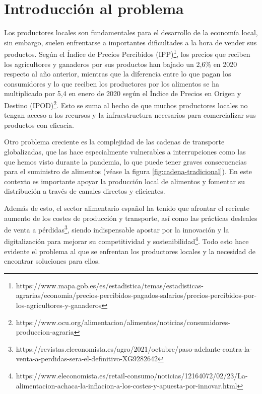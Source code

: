 
\section{Introducción al problema}\label{sec:intro}

Los productores locales son fundamentales para el desarrollo de la economía local, sin embargo, suelen enfrentarse a importantes dificultades a la hora de vender sus productos. Según el Índice de Precios Percibidos (IPP)\footnote{https://www.mapa.gob.es/es/estadistica/temas/estadisticas-agrarias/economia/precios-percibidos-pagados-salarios/precios-percibidos-por-los-agricultores-y-ganaderos}, los precios que reciben los agricultores y ganaderos por sus productos han bajado un 2,6\% en 2020 respecto al año anterior, mientras que la diferencia entre lo que pagan los consumidores y lo que reciben los productores por los alimentos se ha multiplicado por 5,4 en enero de 2020 según el Índice de Precios en Origen y Destino (IPOD)\footnote{https://www.ocu.org/alimentacion/alimentos/noticias/consumidores-produccion-agraria}. Esto se suma al hecho de que muchos productores locales no tengan acceso a los recursos y la infraestructura necesarios para comercializar sus productos con eficacia.

Otro problema creciente es la complejidad de las cadenas de transporte globalizadas, que las hace especialmente vulnerables a interrupciones como las que hemos visto durante la pandemia, lo que puede tener graves consecuencias para el suministro de alimentos (véase la figura \ref{fig:cadena-tradicional}). En este contexto es importante apoyar la producción local de alimentos y fomentar su distribución a través de canales directos y eficientes.

Además de esto, el sector alimentario español ha tenido que afrontar el reciente aumento de los costes de producción y transporte, así como las prácticas desleales de venta a pérdidas\footnote{https://revistas.eleconomista.es/agro/2021/octubre/paso-adelante-contra-la-venta-a-perdidas-sera-el-definitivo-XG9282642}, siendo indispensable apostar por la innovación y la digitalización para mejorar su competitividad y sostenibilidad\footnote{https://www.eleconomista.es/retail-consumo/noticias/12164072/02/23/La-alimentacion-achaca-la-inflacion-a-los-costes-y-apuesta-por-innovar.html}. Todo esto hace evidente el problema al que se enfrentan los productores locales y la necesidad de encontrar soluciones para ellos.

